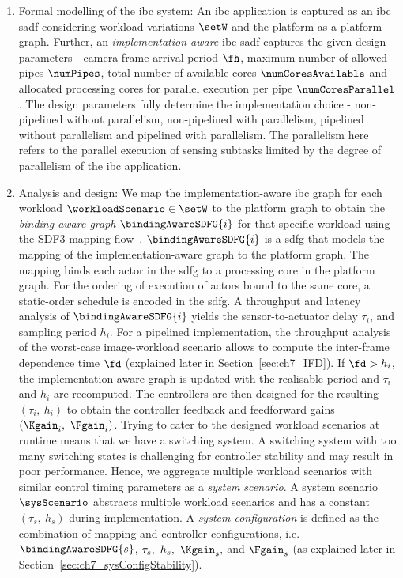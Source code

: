 \begin{enumerate}
    \item Formal modelling of the \gls{ibc} system: An \gls{ibc} application is captured as an \gls{ibc} \gls{sadf} considering workload variations $\setW$ and the platform as a platform graph. Further, an \emph{implementation-aware} \gls{ibc} \gls{sadf} captures the given design parameters - camera frame arrival period $\fh$, maximum number of allowed pipes $\numPipes$, total number of available cores $\numCoresAvailable$ and allocated processing cores for parallel execution per pipe $\numCoresParallel$.
    The design parameters fully determine the implementation choice - non-pipelined without parallelism, non-pipelined with parallelism, pipelined without par\-al\-lelism and pipelined with parallelism. The parallelism here refers to the parallel execution of sensing subtasks limited by the degree of parallelism of the \gls{ibc} application.
    \item Analysis and design: We map the implementation-aware \gls{ibc} graph for each workload $\workloadScenario \in \setW$ to the platform graph to obtain the \emph{binding-aware graph} $\bindingAwareSDFG{i}$ for that specific workload using the SDF3 mapping flow~\cite{stuijk2007}. 
    $\bindingAwareSDFG{i}$ is a \gls{sdfg} that models the mapping of the implemen\-tation-aware graph to the platform graph. The mapping binds each actor in the \gls{sdfg} to a processing core in the platform graph. For the ordering of execution of actors bound to the same core, a static-order schedule is encoded in the \gls{sdfg}.
    A throughput and latency analysis of $\bindingAwareSDFG{i}$ yields the sensor-to-actuator delay $\tau_i$, and sampling period $h_i$.
    For a pipelined implementation, the throughput analysis of the worst-case image-workload scenario allows to compute the inter-frame dependence time $\fd$ (explained later in Section~\ref{sec:ch7_IFD}). 
    If $\fd>h_i$, the implementation-aware graph is updated with the realisable period and $\tau_i$ and $h_i$ are recomputed. 
     The controllers are then designed for the resulting $(\tau_i,\ h_i)$ to obtain the controller feedback and feedforward gains $(\Kgain_i,\ \Fgain_i)$.
     Trying to cater to the designed workload scenarios at runtime means that we have a switching system. A switching system with too many switching states is challenging for controller stability and may result in poor performance. 
     Hence, we aggregate multiple workload scenarios with similar control timing parameters as a \emph{system scenario}.
    A system scenario $\sysScenario$ abstracts multiple workload scenarios and has a constant $(\tau_s,\ h_s)$ during implementation. A \emph{system configuration} is defined as the combination of mapping and controller configurations, i.e. $\bindingAwareSDFG{s}$, $\tau_s,\ h_s,\ \Kgain_s,$ and $\Fgain_s$ (as explained later in Section~\ref{sec:ch7_sysConfigStability}).

\end{enumerate}
